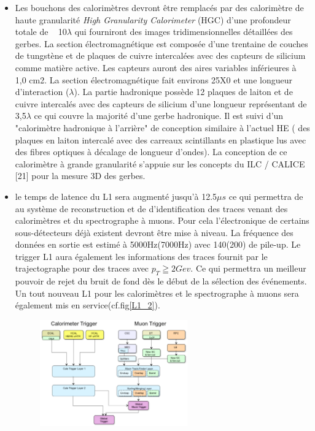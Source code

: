 \begin{itemize}[label=$\bullet$]
	\item Les bouchons des calorimètres devront être remplacés par des calorimètre de haute granularité \textit{High Granularity Calorimeter} (HGC) d'une profondeur totale de ~ 10$\lambda$ qui fourniront des images tridimensionnelles détaillées des gerbes. La section électromagnétique est composée d'une trentaine de couches de tungstène et de plaques de cuivre intercalées avec des capteurs de silicium comme matière active. Les capteurs auront des aires variables inférieures à ~ 1,0 cm2. La section électromagnétique fait environs 25X0 et une longueur d'interaction ($\lambda$). La partie hadronique possède 12 plaques de laiton et de cuivre intercalés avec des capteurs de silicium d'une longueur représentant de 3,5$\lambda$ ce qui couvre la majorité d'une gerbe hadronique. Il est suivi d'un "calorimètre hadronique à l'arrière" de conception similaire à l'actuel HE ( des plaques en laiton intercalé avec des carreaux scintillants en plastique lus avec des fibres optiques à décalage de longueur d'ondes). La conception de ce calorimètre à grande granularité s'appuie sur les concepts du ILC / CALICE [21] pour la mesure 3D des gerbes.
	\item le temps de latence du L1 sera augmenté jusqu'à 12.5$\mu s$ ce qui permettra de au système de reconstruction et de d'identification des traces venant des calorimètres et du spectrographe à muons. Pour cela l'électronique de certains sous-détecteurs déjà existent devront être mise à niveau. La fréquence des données en sortie est estimé à 5000Hz(7000Hz) avec 140(200) de pile-up. Le trigger L1 aura également les informations des traces fournit par le trajectographe pour des traces avec $p_{T}\geqq2	Gev$. Ce qui permettra un meilleur pouvoir de rejet du bruit de fond dès le début de la sélection des événements. Un tout nouveau L1 pour les calorimètres et le spectrographe à muons sera également mis en service(cf.fig\ref{L1_2}).
	\begin{figure}[ht!]
		\centering
		\includegraphics[width=0.60\textwidth]{CMS/L1_2.png}

\end{figure}
\end{itemize}
